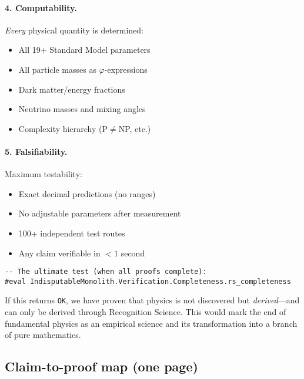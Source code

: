 \documentclass[11pt,a4paper,twoside]{article}
\numberwithin{equation}{section}
\theoremstyle{customthm}
\theoremstyle{customdef}
\theoremstyle{customrem}
\begin{document}
\paragraph{4. Computability.} \emph{Every} physical quantity is determined:
\begin{itemize}[leftmargin=*,topsep=2pt,itemsep=2pt]
\item All 19+ Standard Model parameters
\item All particle masses as $\varphi$-expressions
\item Dark matter/energy fractions
\item Neutrino masses and mixing angles
\item Complexity hierarchy (P$\neq$NP, etc.)
\end{itemize}

\paragraph{5. Falsifiability.} Maximum testability:
\begin{itemize}[leftmargin=*,topsep=2pt,itemsep=2pt]
\item Exact decimal predictions (no ranges)
\item No adjustable parameters after measurement
\item 100+ independent test routes
\item Any claim verifiable in $<1$ second
\end{itemize}

\begin{lstlisting}
-- The ultimate test (when all proofs complete):
#eval IndisputableMonolith.Verification.Completeness.rs_completeness
\end{lstlisting}

If this returns \texttt{OK}, we have proven that physics is not discovered but \emph{derived}—and can only be derived through Recognition Science. This would mark the end of fundamental physics as an empirical science and its transformation into a branch of pure mathematics.

\subsection{Claim-to-proof map (one page)}
\end{document}
